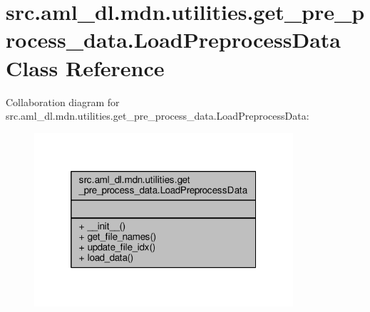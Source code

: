 \hypertarget{classsrc_1_1aml__dl_1_1mdn_1_1utilities_1_1get__pre__process__data_1_1_load_preprocess_data}{\section{src.\-aml\-\_\-dl.\-mdn.\-utilities.\-get\-\_\-pre\-\_\-process\-\_\-data.\-Load\-Preprocess\-Data Class Reference}
\label{classsrc_1_1aml__dl_1_1mdn_1_1utilities_1_1get__pre__process__data_1_1_load_preprocess_data}
}


Collaboration diagram for src.\-aml\-\_\-dl.\-mdn.\-utilities.\-get\-\_\-pre\-\_\-process\-\_\-data.\-Load\-Preprocess\-Data\-:
\nopagebreak
\begin{figure}[H]
\begin{center}
\leavevmode
\includegraphics[width=272pt]{classsrc_1_1aml__dl_1_1mdn_1_1utilities_1_1get__pre__process__data_1_1_load_preprocess_data__coll__graph}
\end{center}
\end{figure}
